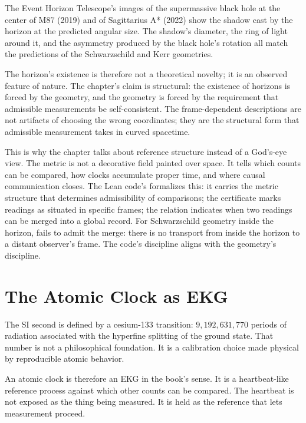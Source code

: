 The Event Horizon Telescope's images of the supermassive black hole at the
center of M87 (2019) and of Sagittarius A* (2022) show the shadow cast by
the horizon at the predicted angular size. The shadow's diameter, the ring
of light around it, and the asymmetry produced by the black hole's rotation
all match the predictions of the Schwarzschild and Kerr geometries.

The horizon's existence is therefore not a theoretical novelty; it is an
observed feature of nature. The chapter's claim is structural: the
existence of horizons is forced by the geometry, and the geometry is
forced by the requirement that admissible measurements be self-consistent.
The frame-dependent descriptions are not artifacts of choosing the wrong
coordinates; they are the structural form that admissible measurement
takes in curved spacetime.

This is why the chapter talks about reference structure instead of a
God's-eye view. The metric is not a decorative field painted over space.
It tells which counts can be compared, how clocks accumulate proper time,
and where causal communication closes. The Lean code's
 formalizes this: it carries the metric structure
that determines admissibility of comparisons; the  certificate
marks readings as situated in specific frames; the  relation
indicates when two  readings can be merged into a global
record. For Schwarzschild geometry inside the horizon,  fails
to admit the merge: there is no transport from inside the horizon to a
distant observer's frame. The code's discipline aligns with the geometry's
discipline.

\section{The Atomic Clock as EKG}
\label{se:the-atomic-clock-as-ekg}

The SI second is defined by a cesium-133 transition: $9,192,631,770$ periods of
radiation associated with the hyperfine splitting of the ground state. That
number is not a philosophical foundation. It is a calibration choice made
physical by reproducible atomic behavior.

An atomic clock is therefore an EKG in the book's sense. It is a heartbeat-like
reference process against which other counts can be compared. The heartbeat is
not exposed as the thing being measured. It is held as the reference that lets
measurement proceed.

